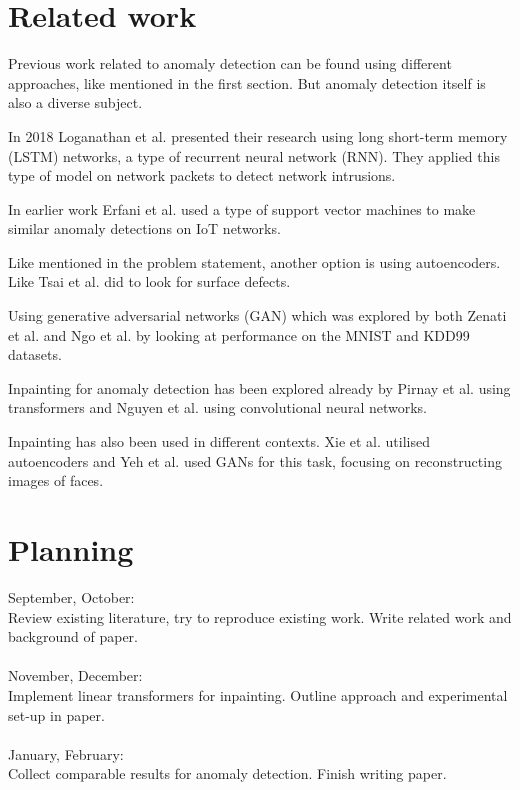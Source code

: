 \documentclass{article}
\begin{document}
\section{Related work}

Previous work related to anomaly detection can be found using different approaches, like mentioned in the first section. But anomaly detection itself is also a diverse subject.

In 2018 Loganathan et al.\cite{loganathan_sequence_2018} presented their research using long short-term memory (LSTM) networks, a type of recurrent neural network (RNN). They applied this type of model on network packets to detect network intrusions.

In earlier work Erfani et al.\cite{erfani_high-dimensional_2016} used a type of support vector machines to make similar anomaly detections on IoT networks.

Like mentioned in the problem statement, another option is using autoencoders. Like Tsai et al.\cite{tsai_autoencoder-based_2021} did to look for surface defects.

Using generative adversarial networks (GAN) which was explored by both Zenati et al.\cite{zenati_efficient_2019} and Ngo et al.\cite{ngo_fence_2019} by looking at performance on the MNIST and KDD99 datasets.

Inpainting for anomaly detection has been explored already by Pirnay et al.\cite{pirnay_inpainting_2021} using transformers and Nguyen et al.\cite{adversarial-pirnay_inpainting_2021} using convolutional neural networks.

Inpainting has also been used in different contexts. Xie et al.\cite{xie_image_2012} utilised autoencoders and Yeh et al.\cite{yeh_semantic_2017} used GANs for this task, focusing on reconstructing images of faces. 

\section{Planning}

September, October:\\
Review existing literature, try to reproduce existing work. Write related work and background of paper.\\
\\
November, December:\\
Implement linear transformers for inpainting. Outline approach and experimental set-up in paper.\\
\\
January, February:\\
Collect comparable results for anomaly detection. Finish writing paper.


 

\end{document}
